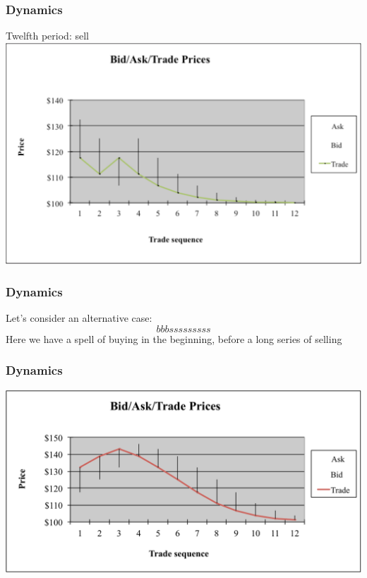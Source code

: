 \documentclass[english,10pt]{beamer}
\begin{document}
\begin{frame} [noframenumbering]
	\frametitle{Dynamics}
	Twelfth period: sell
	\center
	\includegraphics[width=0.9\linewidth]{pics/P12_Image.pdf}
\end{frame}


\begin{frame} [noframenumbering]
	\frametitle{Dynamics}
	Let's consider an alternative case:
	\[
	bbbsssssssss
	\]
	Here we have a spell of buying in the beginning, before a long series of selling
\end{frame}


\begin{frame} [noframenumbering]
	\frametitle{Dynamics}
	\includegraphics[width=1\linewidth]{pics/Bubble_Image.pdf}
	\hyperlink{example}{}
\end{frame}
\end{document}
